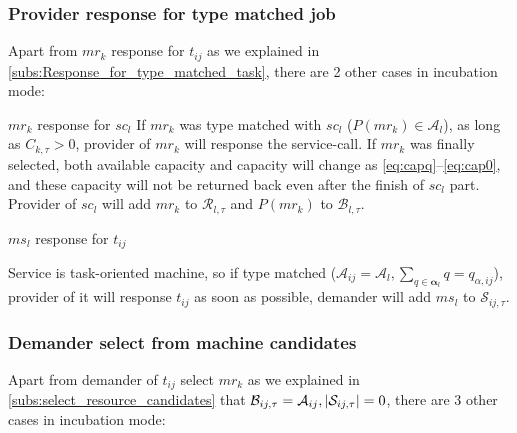 \subsubsection{Provider response for type matched job} %
\label{ssub:response_in_type_matched_resource}
Apart from $mr_k$ response for $t_{ij}$ as we explained in \autoref{subs:Response_for_type_matched_task}, there are 2 other cases in incubation mode:
\begin{asparaenum}
\item $mr_k$ response for $sc_l$
If $mr_k$ was type matched with $sc_l$ ($P(mr_k)\in\mathcal{A}_l$), as long as $C_{k,\tau}> 0$, provider of $mr_k$ will response the service-call. If $mr_k$ was finally selected, both available capacity and capacity will change as \autoref{eq:capq}--\ref{eq:cap0}, and these capacity will not be returned back even after the finish of $sc_l$ part. Provider of $sc_l$ will add $mr_k$ to $\mathcal{R}_{l,\tau}$ and $P(mr_k)$ to $\mathcal{B}_{l,\tau}$.
\item $ms_l$ response for $t_{ij}$
\end{asparaenum}
Service is task-oriented machine, so if type matched ($\mathcal{A}_{ij} =\mathcal{A}_l,\sum_{q\in\bm{\alpha}_l} q = q_{\alpha,ij}$), provider of it will response $t_{ij}$ as soon as possible, demander will add $ms_l$ to $\mathcal{S}_{ij,\tau}$.


\subsubsection{Demander select from machine candidates} %
\label{ssub:selection_in_resource_candidates_for_service_call}
Apart from demander of $t_{ij}$ select $mr_k$ as we explained in \autoref{subs:select_resource_candidates} that $\mathcal{B}_{ij,\tau} = \mathcal{A}_{ij},\left|\mathcal{S}_{ij,\tau}\right|=0$, there are 3 other cases in incubation mode:

